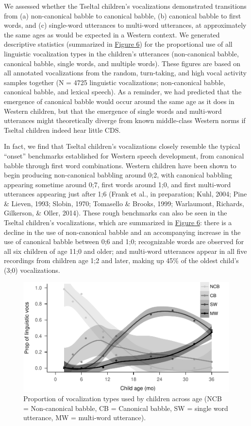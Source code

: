 \documentclass[floatsintext,man]{apa6}
\theoremstyle{definition}
\theoremstyle{definition}
\theoremstyle{definition}
\theoremstyle{remark}
\begin{document}
We assessed whether the Tseltal children's vocalizations demonstrated
transitions from (a) non-canonical babble to canonical babble, (b)
canonical babble to first words, and (c) single-word utterances to
multi-word utterances, at approximately the same ages as would be
expected in a Western context. We generated descriptive statistics
(summarized in \protect\hyperlink{fig6}{Figure 6}) for the proportional
use of all linguistic vocalization types in the children's utterances
(non-canonical babble, canonical babble, single words, and multiple
words). These figures are based on all annotated vocalizations from the
random, turn-taking, and high vocal activity samples together (N = 4725
linguistic vocalizations; non-canonical babble, canonical babble, and
lexical speech). As a reminder, we had predicted that the emergence of
canonical babble would occur around the same age as it does in Western
children, but that the emergence of single words and multi-word
utterances might theoretically diverge from known middle-class Western
norms if Tseltal children indeed hear little CDS.

In fact, we find that Tseltal children's vocalizations closely resemble
the typical \enquote{onset} benchmarks established for Western speech
development, from canonical babble through first word combinations.
Western children have been shown to begin producing non-canonical
babbling around 0;2, with canonical babbling appearing sometime around
0;7, first words around 1;0, and first multi-word utterances appearing
just after 1;6 (Frank et al., in preparation; Kuhl, 2004; Pine \&
Lieven, 1993; Slobin, 1970; Tomasello \& Brooks, 1999; Warlaumont,
Richards, Gilkerson, \& Oller, 2014). These rough benchmarks can also be
seen in the Tseltal children's vocalizations, which are summarized in
\protect\hyperlink{fig6}{Figure 6}: there is a decline in the use of
non-canonical babble and an accompanying increase in the use of
canonical babble between 0;6 and 1;0; recognizable words are observed
for all six children of age 11;0 and older; and multi-word utterances
appear in all five recordings from children age 1;2 and later, making up
45\% of the oldest child's (3;0) vocalizations.

\begin{figure}
\centering
\includegraphics{Tseltal-CLE_files/figure-latex/fig6-1.pdf}
\caption{\label{fig:fig6}Proportion of vocalization types used by children
across age (NCB = Non-canonical babble, CB = Canonical babble, SW =
single word utterance, MW = multi-word utterance).}
\end{figure}
\end{document}
